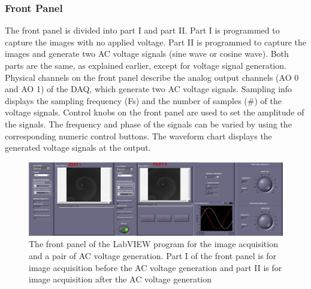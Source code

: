 \documentclass[journal=jacsat,manuscript=article]{achemso}
\begin{document}
\subsubsection{Front Panel}
The front panel is divided into part I and part II. Part I is
programmed to capture the images with no applied voltage.  Part II is
programmed to capture the images and generate two AC voltage signals
(sine wave or cosine wave). Both parts are the same, as explained
earlier, except for voltage signal generation. Physical channels on
the front panel describe the analog output channels (AO 0 and AO 1) of
the DAQ, which generate two AC voltage signals. Sampling info displays
the sampling frequency (Fs) and the number of samples (\#) of the
voltage signals. Control knobs on the front panel are used to set the
amplitude of the signals. The frequency and phase of the signals can
be varied by using the corresponding numeric control buttons. The
waveform chart displays the generated voltage signals at the output.
\begin{figure}[H]
    \centering
    \includegraphics[width=\linewidth,height=0.6\linewidth]{polarised - Copy.png}
    \caption{The front panel of the LabVIEW program for the image
      acquisition and a pair of AC voltage generation. Part I of the
      front panel is for image acquisition before the AC voltage
      generation and part II is for image acquisition after the AC
      voltage generation}
    \label{fig:ex7}
\end{figure}
\end{document}

